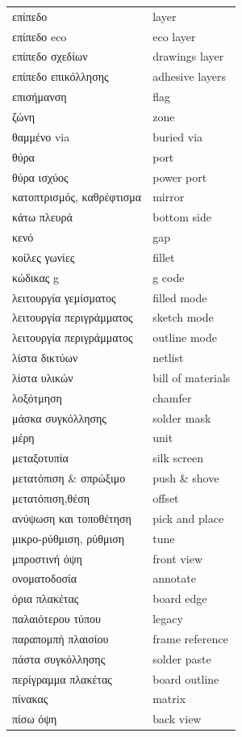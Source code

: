 \documentclass[a4paper]{article}
\begin{document}
\begin{longtabu}{ l l }
    επίπεδο	&	layer	\\
    επίπεδο eco	&	eco layer	\\
    επίπεδο σχεδίων	&	drawings layer	\\
    επίπεδο επικόλλησης	&	adhesive layers	\\
    επισήμανση	&	flag	\\
    ζώνη	&	zone	\\
    θαμμένο via	&	buried via	\\
    θύρα	&	port	\\
    θύρα ισχύος	&	power port	\\
    κατοπτρισμός, καθρέφτισμα	&	mirror	\\
    κάτω πλευρά	&	bottom side	\\
    κενό	&	gap	\\
    κοίλες γωνίες	&	fillet	\\
    κώδικας g	&	g code	\\
    λειτουργία γεμίσματος	&	filled mode	\\
    λειτουργία περιγράμματος	&	sketch mode	\\
    λειτουργία περιγράμματος	&	outline mode	\\
    λίστα δικτύων	&	netlist	\\
    λίστα υλικών	&	bill of materials	\\
    λοξότμηση	&	chamfer	\\
    μάσκα συγκόλλησης	&	solder mask	\\
    μέρη	&	unit	\\
    μεταξοτυπία	&	silk screen	\\
    μετατόπιση \& σπρώξιμο	&	push \& shove	\\
    μετατόπιση,θέση	&	offset	\\
    ανύψωση και τοποθέτηση	&	pick and place \\
    μικρο-ρύθμιση, ρύθμιση	&	tune	\\
    μπροστινή όψη	&	front view	\\
    ονοματοδοσία	&	annotate	\\
    όρια πλακέτας	&	board edge	\\
    παλαιότερου τύπου	&	legacy	\\
    παραπομπή πλαισίου	&	frame reference	\\
    πάστα συγκόλλησης	&	solder paste	\\
    περίγραμμα πλακέτας	&	board outline	\\
    πίνακας	&	matrix	\\
    πίσω όψη	&	back view	\\

\end{longtabu}
\end{document}
